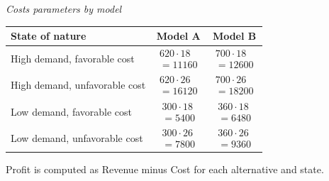 		\begin{center}
			\textit{Costs parameters by model} \\
			\begin{tabular}{l c c}
				\toprule
				State of nature & Model A & Model B \\
				\midrule
				High demand, favorable cost &
				$\begin{array}{l}
					620\cdot 18\\
					= 11160
				\end{array}$ &
				$\begin{array}{l}
					700\cdot 18\\
					= 12600
				\end{array}$ \\
				High demand, unfavorable cost &
				$\begin{array}{l}
					620\cdot 26\\
					= 16120
				\end{array}$ &
				$\begin{array}{l}
					700\cdot 26\\
					= 18200
				\end{array}$ \\
				Low demand, favorable cost &
				$\begin{array}{l}
					300\cdot 18\\
					= 5400
				\end{array}$ &
				$\begin{array}{l}
					360\cdot 18\\
					= 6480
				\end{array}$ \\
				Low demand, unfavorable cost &
				$\begin{array}{l}
					300\cdot 26\\
					= 7800
				\end{array}$ &
				$\begin{array}{l}
					360\cdot 26\\
					= 9360
				\end{array}$ \\
				\bottomrule
			\end{tabular}
		\end{center}
		Profit is computed as Revenue minus Cost for each alternative and state.
